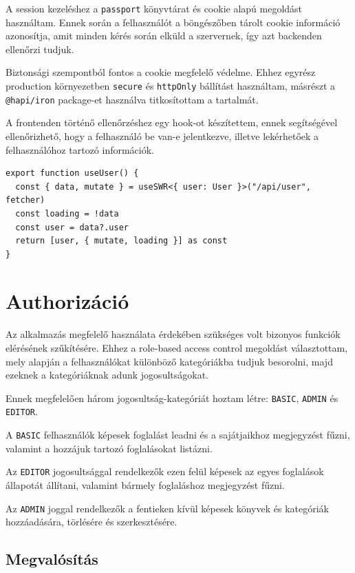 A session kezeléshez a \lstinline|passport| könyvtárat és cookie alapú megoldást használtam. Ennek során a felhasználót a böngészőben
tárolt cookie információ azonosítja, amit minden kérés során elküld a szervernek, így azt backenden ellenőrzi tudjuk.

Biztonsági szempontból fontos a cookie megfelelő védelme. Ehhez egyrész production környezetben \lstinline|secure| és \lstinline|httpOnly| bállítást használtam,
másrészt a \lstinline|@hapi/iron| package-et használva titkosítottam a tartalmát.

A frontenden történő ellenőrzéshez egy hook-ot készítettem, ennek segítségével ellenőrizhető, hogy a felhasználó be van-e jelentkezve,
illetve lekérhetőek a felhasználóhoz tartozó információk.

\begin{lstlisting}[caption=Authentikáció hook]
export function useUser() {
  const { data, mutate } = useSWR<{ user: User }>("/api/user", fetcher)
  const loading = !data
  const user = data?.user
  return [user, { mutate, loading }] as const
}
\end{lstlisting}

\section{Authorizáció}

Az alkalmazás megfelelő használata érdekében szükséges volt bizonyos funkciók elérésének szűkítésére. Ehhez a role-based access control
megoldást választottam, mely alapján a felhasználókat különböző kategóriákba tudjuk besorolni, majd ezeknek a kategóriáknak adunk jogosultságokat.

Ennek megfelelően három jogosultság-kategóriát hoztam létre: \lstinline|BASIC|, \lstinline|ADMIN| és \lstinline|EDITOR|.

A \lstinline|BASIC| felhasználók képesek foglalást leadni és a sajátjaikhoz megjegyzést fűzni, valamint a hozzájuk tartozó foglalásokat listázni.

Az \lstinline|EDITOR| jogosultsággal rendelkezők ezen felül képesek az egyes foglalások állapotát állítani, valamint bármely foglaláshoz
megjegyzést fűzni.

Az \lstinline|ADMIN| joggal rendelkezők a fentieken kívül képesek könyvek és kategóriák hozzáadására, törlésére és szerkesztésére.

\subsection{Megvalósítás}

